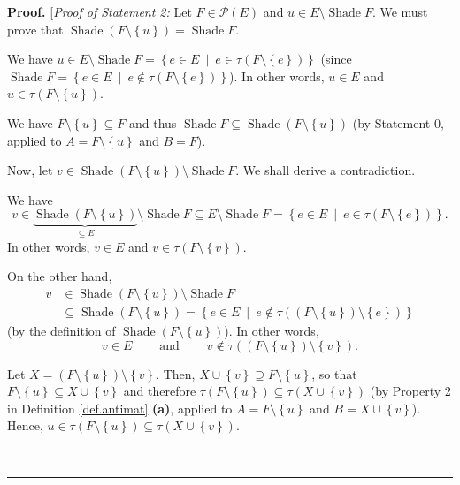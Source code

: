 \documentclass[numbers=enddot,12pt,final,onecolumn]{scrartcl}%
\theoremstyle{definition}
\newenvironment{proof}[1][Proof]{\noindent\textbf{#1.} }{\ \rule{0.5em}{0.5em}}
\begin{document}
\begin{proof}
[\textit{Proof of Statement 2:} Let $F\in\mathcal{P}\left(  E\right)  $ and
$u\in E\setminus\operatorname*{Shade}F$. We must prove that
$\operatorname*{Shade}\left(  F\setminus\left\{  u\right\}  \right)
=\operatorname*{Shade}F$.

We have $u\in E\setminus\operatorname*{Shade}F=\left\{  e\in E\ \mid\ e\in
\tau\left(  F\setminus\left\{  e\right\}  \right)  \right\}  $ (since
\newline$\operatorname*{Shade}F=\left\{  e\in E\ \mid\ e\notin\tau\left(
F\setminus\left\{  e\right\}  \right)  \right\}  $). In other words, $u\in E$
and $u\in\tau\left(  F\setminus\left\{  u\right\}  \right)  $.

We have $F\setminus\left\{  u\right\}  \subseteq F$ and thus
$\operatorname*{Shade}F\subseteq\operatorname*{Shade}\left(  F\setminus
\left\{  u\right\}  \right)  $ (by Statement 0, applied to $A=F\setminus
\left\{  u\right\}  $ and $B=F$).

Now, let $v\in\operatorname*{Shade}\left(  F\setminus\left\{  u\right\}
\right)  \setminus\operatorname*{Shade}F$. We shall derive a contradiction.

We have
\[
v\in\underbrace{\operatorname*{Shade}\left(  F\setminus\left\{  u\right\}
\right)  }_{\subseteq E}\setminus\operatorname*{Shade}F\subseteq
E\setminus\operatorname*{Shade}F=\left\{  e\in E\ \mid\ e\in\tau\left(
F\setminus\left\{  e\right\}  \right)  \right\}  .
\]
In other words, $v\in E$ and $v\in\tau\left(  F\setminus\left\{  v\right\}
\right)  $.

On the other hand,%
\begin{align*}
v  &  \in\operatorname*{Shade}\left(  F\setminus\left\{  u\right\}  \right)
\setminus\operatorname*{Shade}F\\
&  \subseteq\operatorname*{Shade}\left(  F\setminus\left\{  u\right\}
\right)  =\left\{  e\in E\ \mid\ e\notin\tau\left(  \left(  F\setminus\left\{
u\right\}  \right)  \setminus\left\{  e\right\}  \right)  \right\}
\end{align*}
(by the definition of $\operatorname*{Shade}\left(  F\setminus\left\{
u\right\}  \right)  $). In other words,
\[
v\in E\ \ \ \ \ \ \ \ \ \ \text{and}\ \ \ \ \ \ \ \ \ \ v\notin\tau\left(
\left(  F\setminus\left\{  u\right\}  \right)  \setminus\left\{  v\right\}
\right)  .
\]


Let $X=\left(  F\setminus\left\{  u\right\}  \right)  \setminus\left\{
v\right\}  $. Then, $X\cup\left\{  v\right\}  \supseteq F\setminus\left\{
u\right\}  $, so that $F\setminus\left\{  u\right\}  \subseteq X\cup\left\{
v\right\}  $ and therefore $\tau\left(  F\setminus\left\{  u\right\}  \right)
\subseteq\tau\left(  X\cup\left\{  v\right\}  \right)  $ (by Property 2 in
Definition \ref{def.antimat} \textbf{(a)}, applied to $A=F\setminus\left\{
u\right\}  $ and $B=X\cup\left\{  v\right\}  $). Hence, $u\in\tau\left(
F\setminus\left\{  u\right\}  \right)  \subseteq\tau\left(  X\cup\left\{
v\right\}  \right)  $.


\end{proof}
\end{document}
